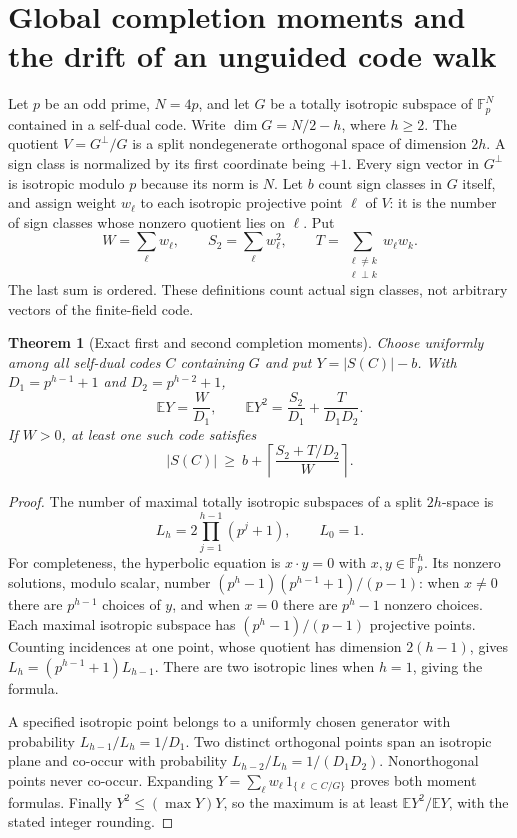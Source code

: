 \documentclass[11pt]{article}
\newtheorem{theorem}{Theorem}[section]
\begin{document}
\section{Global completion moments and the drift of an unguided code walk}
\label{sec:completion-moments}

Let $p$ be an odd prime, $N=4p$, and let $G$ be a totally isotropic
subspace of $\mathbb F_p^N$ contained in a self-dual code. Write
$\dim G=N/2-h$, where $h\ge2$. The quotient
$V=G^\perp/G$ is a split nondegenerate orthogonal space of dimension
$2h$. A sign class is normalized by its first coordinate being $+1$.
Every sign vector in $G^\perp$ is isotropic modulo $p$ because its
norm is $N$. Let $b$ count sign classes in $G$ itself, and assign
weight $w_\ell$ to each isotropic projective point $\ell$ of $V$:
it is the number of sign classes whose nonzero quotient lies on
$\ell$. Put
\[
 W=\sum_\ell w_\ell,\qquad S_2=\sum_\ell w_\ell^2,\qquad
 T=\sum_{\substack{\ell\ne k\\\ell\perp k}}w_\ell w_k.
\]
The last sum is ordered. These definitions count actual sign classes,
not arbitrary vectors of the finite-field code.

\begin{theorem}[Exact first and second completion moments]
\label{mom:two}
Choose uniformly among all self-dual codes $C$ containing $G$ and
put $Y=|S(C)|-b$. With $D_1=p^{h-1}+1$ and $D_2=p^{h-2}+1$,
\[
 \mathbb E Y=\frac{W}{D_1},\qquad
 \mathbb E Y^2=\frac{S_2}{D_1}+\frac{T}{D_1D_2}.
\]
If $W>0$, at least one such code satisfies
\[
 |S(C)|\ \ge\
 b+\left\lceil\frac{S_2+T/D_2}{W}\right\rceil.
\]
\end{theorem}
\begin{proof}
The number of maximal totally isotropic subspaces of a split
$2h$-space is
\[
 L_h=2\prod_{j=1}^{h-1}(p^j+1),\qquad L_0=1.
\]
For completeness, the hyperbolic equation is $x\cdot y=0$ with
$x,y\in\mathbb F_p^h$. Its nonzero solutions, modulo scalar, number
$(p^h-1)(p^{h-1}+1)/(p-1)$: when $x\ne0$ there are $p^{h-1}$
choices of $y$, and when $x=0$ there are $p^h-1$ nonzero choices.
Each maximal isotropic subspace has $(p^h-1)/(p-1)$ projective points.
Counting incidences at one point, whose quotient has dimension
$2(h-1)$, gives $L_h=(p^{h-1}+1)L_{h-1}$.
There are two isotropic lines when $h=1$, giving the formula.

A specified isotropic point belongs to a uniformly chosen generator
with probability $L_{h-1}/L_h=1/D_1$. Two distinct orthogonal points
span an isotropic plane and co-occur with probability
$L_{h-2}/L_h=1/(D_1D_2)$. Nonorthogonal points never co-occur.
Expanding $Y=\sum_\ell w_\ell\,1_{\{\ell\subset C/G\}}$ proves both
moment formulas. Finally $Y^2\le(\max Y)Y$, so the maximum is at least
$\mathbb E Y^2/\mathbb E Y$, with the stated integer rounding.
\end{proof}
\end{document}
